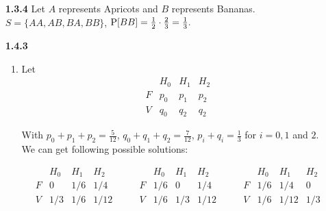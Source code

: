 \documentclass{article}
\begin{document}
\begin{enumerate}
    \item [\textbf{1.3.4}]
    Let $A$ represents Apricots and $B$ represents Bananas. \\
    $S = \{AA, AB, BA, BB\}$, $\mbox P[BB] = \frac{1}{2} \cdot \frac{2}{3} = \frac{1}{3}.$

    \item [\textbf{1.4.3}]
    \begin{enumerate}[label=(\alph*)]
        \item
        Let 
        $$
        \begin{array}{c|ccc}
            & H_0 & H_1 & H_2 \\
        \hline
        F   & p_0 & p_1 & p_2 \\
        V   & q_0 & q_2 & q_2
        \end{array}
        $$

        With $p_0 + p_1 + p_2 = \frac{5}{12}$, $q_0 + q_1 + q_2 = \frac{7}{12}$, $p_i + q_i = \frac{1}{3}$ for $i = 0, 1$ and $2$. We can get following possible solutions:

        $$
        \begin{array}{c|ccc}
            & H_0   & H_1   & H_2 \\
        \hline
        F   & 0     & 1 / 6 & 1 / 4 \\
        V   & 1 / 3 & 1 / 6 & 1 / 12
        \end{array} \qquad
        \begin{array}{c|ccc}
            & H_0   & H_1   & H_2 \\
        \hline
        F   & 1 / 6 & 0     & 1 / 4 \\
        V   & 1 / 6 & 1 / 3 & 1 / 12
        \end{array} \qquad
        \begin{array}{c|ccc}
            & H_0   & H_1    & H_2 \\
        \hline
        F   & 1 / 6 & 1 / 4  & 0 \\
        V   & 1 / 6 & 1 / 12 & 1 / 3
        \end{array}
        $$


\end{enumerate}
\end{enumerate}
\end{document}
